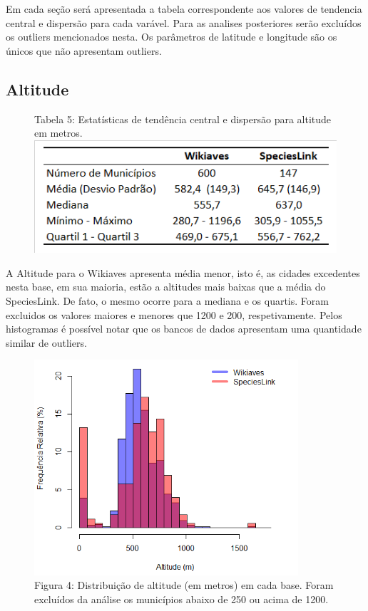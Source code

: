 \documentclass[12pt]{extarticle}
\newenvironment{resposta}{ \color{mygray}}{}
\begin{document}
\begin{resposta}
Em cada seção será apresentada a tabela correspondente aos valores de tendencia central e dispersão para cada varável. Para as analises posteriores serão excluídos os outliers mencionados nesta. Os parâmetros de latitude e longitude são os únicos que não apresentam outliers.
\end{resposta}


\subsection {Altitude}

\begin{figure}[h!]
\centering
{\scriptsize Tabela 5: Estatísticas de tendência central e dispersão para altitude em metros.}
\includegraphics{Imagens/T05.png}
\end{figure}


\begin{resposta}
A Altitude para o Wikiaves apresenta média menor, isto é, as cidades excedentes nesta base, em sua maioria, estão a altitudes mais baixas que a média do SpeciesLink. De fato, o mesmo ocorre para a mediana e os quartis. Foram excluidos os valores maiores e menores que 1200 e 200, respetivamente. Pelos histogramas é possível notar que os bancos de dados apresentam uma quantidade similar de outliers. 
\end{resposta}



\begin{figure}[h!]
\centering
\includegraphics[height = 8cm]{Imagens/H04.png}
\\{\scriptsize Figura 4: Distribuição de altitude (em metros) em cada base. Foram excluídos da análise os municípios abaixo de 250 ou acima de 1200.}
\end{figure}
\end{document}
